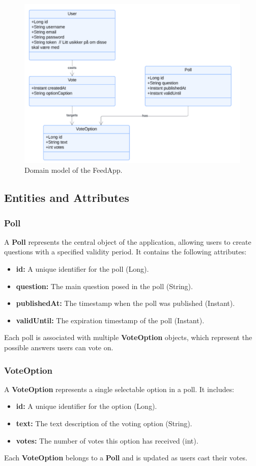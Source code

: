 \begin{figure}[thb]
	\centering
	\includegraphics[scale=0.5]{figs/domainmodel.png}
	\caption{Domain model of the FeedApp.}
	\label{fig:domainmodel}
\end{figure}

\subsection{Entities and Attributes}

\subsubsection{Poll}
A \textbf{Poll} represents the central object of the application, allowing users to create questions with a specified validity period. It contains the following attributes:
\begin{itemize}
    \item \textbf{id:} A unique identifier for the poll (Long).
    \item \textbf{question:} The main question posed in the poll (String).
    \item \textbf{publishedAt:} The timestamp when the poll was published (Instant).
    \item \textbf{validUntil:} The expiration timestamp of the poll (Instant).
\end{itemize}
Each poll is associated with multiple \textbf{VoteOption} objects, which represent the possible answers users can vote on.

\subsubsection{VoteOption}
A \textbf{VoteOption} represents a single selectable option in a poll. It includes:
\begin{itemize}
    \item \textbf{id:} A unique identifier for the option (Long).
    \item \textbf{text:} The text description of the voting option (String).
    \item \textbf{votes:} The number of votes this option has received (int).
\end{itemize}
Each \textbf{VoteOption} belongs to a \textbf{Poll} and is updated as users cast their votes.

